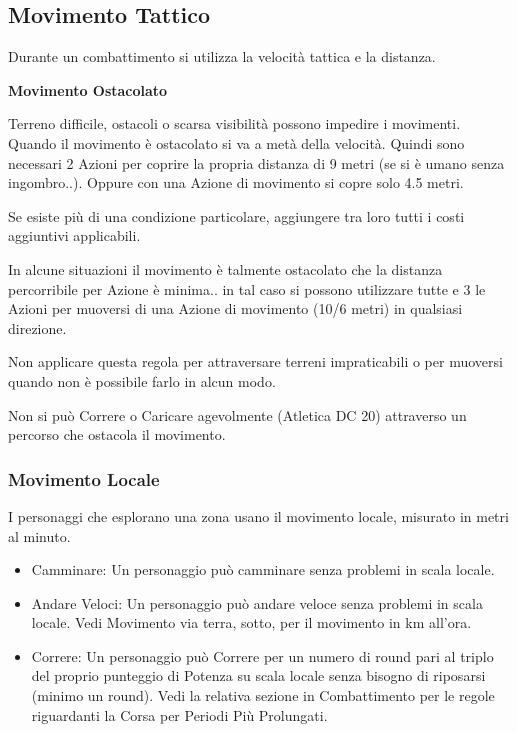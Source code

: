 \documentclass[a4paper,11pt,twoside,openany]{book}
\begin{document}
{\subsection{Movimento Tattico}

Durante un combattimento si utilizza la velocità tattica e la distanza.

\textbf{Movimento Ostacolato}

Terreno difficile, ostacoli o scarsa visibilità possono impedire i movimenti. Quando il movimento è ostacolato si va a metà della velocità. Quindi sono necessari 2 Azioni per coprire la propria distanza di 9 metri (se si è umano senza ingombro..). Oppure con una Azione di movimento si copre solo 4.5 metri.

Se esiste più di una condizione particolare, aggiungere tra loro tutti i costi aggiuntivi applicabili.

In alcune situazioni il movimento è talmente ostacolato che la distanza percorribile per Azione è minima.. in tal caso si possono utilizzare tutte e 3 le Azioni per muoversi di una Azione di movimento (10/6 metri) in qualsiasi direzione.

Non applicare questa regola per attraversare terreni impraticabili o per muoversi quando non è possibile farlo in alcun modo. 

Non si può Correre o Caricare agevolmente (Atletica DC 20) attraverso un percorso che ostacola il movimento.

\subsubsection{Movimento Locale}

I personaggi che esplorano una zona usano il movimento locale, misurato in metri al minuto.
\begin{itemize}
\item 
Camminare: Un personaggio può camminare senza problemi in scala locale. 
\item 
Andare Veloci: Un personaggio può andare veloce senza problemi in scala locale. Vedi Movimento via terra, sotto, per il movimento in km all'ora. 
\item 
Correre: Un personaggio può Correre per un numero di round pari al triplo del proprio punteggio di Potenza su scala locale senza bisogno di riposarsi (minimo un round). Vedi la relativa sezione in Combattimento per le regole riguardanti la Corsa per Periodi Più Prolungati. 
\end{itemize}

}
\end{document}
